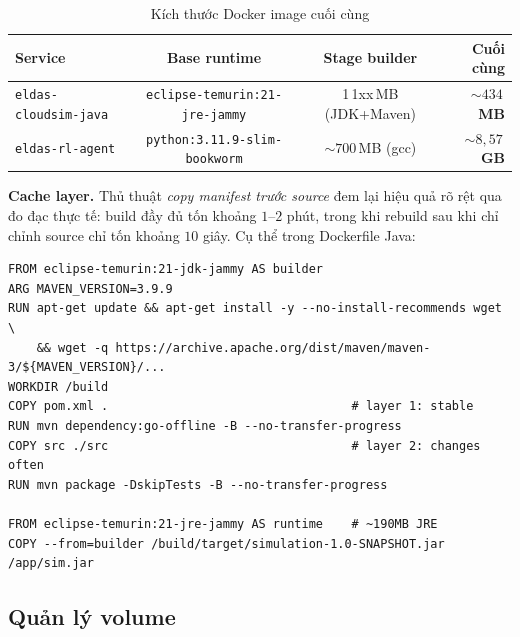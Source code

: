\begin{table}[H]
  \centering
  \caption{Kích thước Docker image cuối cùng}
  \label{tab:image-size}
  \footnotesize
  \begin{tabular}{lccr}
    \toprule
    \textbf{Service} & \textbf{Base runtime} & \textbf{Stage builder} & \textbf{Cuối cùng} \\
    \midrule
    \texttt{eldas-cloudsim-java} & \texttt{eclipse-temurin:21-jre-jammy} & 1\,1xx\,MB (JDK+Maven) & \textbf{$\sim 434$\,MB} \\
    \texttt{eldas-rl-agent}      & \texttt{python:3.11.9-slim-bookworm}   & $\sim 700$\,MB (gcc)   & \textbf{$\sim 8{,}57$\,GB} \\
    \bottomrule
  \end{tabular}
\end{table}

\textbf{Cache layer.} Thủ thuật \emph{copy manifest trước source}
đem lại hiệu quả rõ rệt qua đo đạc thực tế: build đầy đủ tốn
khoảng $1$--$2$ phút, trong khi rebuild sau khi chỉ chỉnh source
chỉ tốn khoảng $10$ giây. Cụ thể trong Dockerfile Java:

\begin{lstlisting}[style=yamlstyle, caption={Trick layer cache: \texttt{pom.xml}
trước, \texttt{src/} sau.}, label={lst:dockerfile-cache}]
FROM eclipse-temurin:21-jdk-jammy AS builder
ARG MAVEN_VERSION=3.9.9
RUN apt-get update && apt-get install -y --no-install-recommends wget \
    && wget -q https://archive.apache.org/dist/maven/maven-3/${MAVEN_VERSION}/...
WORKDIR /build
COPY pom.xml .                                  # layer 1: stable
RUN mvn dependency:go-offline -B --no-transfer-progress
COPY src ./src                                  # layer 2: changes often
RUN mvn package -DskipTests -B --no-transfer-progress

FROM eclipse-temurin:21-jre-jammy AS runtime    # ~190MB JRE
COPY --from=builder /build/target/simulation-1.0-SNAPSHOT.jar /app/sim.jar
\end{lstlisting}

\subsection{Quản lý volume}
\label{ssec:impl-volumes}

